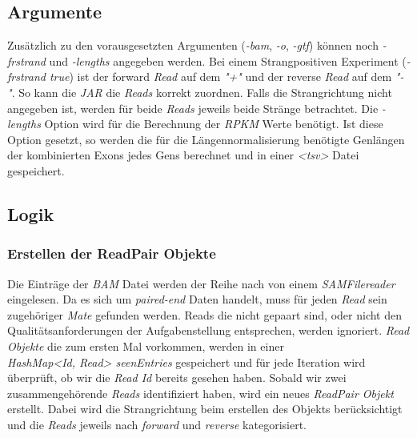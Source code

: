 \documentclass[12pt]{article}
\begin{document}
\subsection{Argumente}
Zusätzlich zu den vorausgesetzten Argumenten (\textit{-bam}, \textit{-o}, \textit{-gtf}) können noch \textit{-frstrand} und
\textit{-lengths} angegeben werden. 
Bei einem Strangpositiven Experiment (\textit{-frstrand true}) ist der forward \textit{Read} auf dem \textit{"+"} und der reverse \textit{Read} auf dem
\textit{"-"}. So kann die \textit{JAR} die \textit{Reads} korrekt zuordnen. 
Falls die Strangrichtung nicht angegeben ist, werden für beide \textit{Reads} jeweils beide Stränge betrachtet.
Die \textit{-lengths} Option wird für die Berechnung der \textit{RPKM} Werte benötigt. 
Ist diese Option gesetzt, so werden die für die Längennormalisierung benötigte Genlängen der kombinierten Exons jedes
Gens berechnet und in einer \textit{<tsv>} Datei gespeichert.
\subsection{Logik}
\subsubsection{Erstellen der ReadPair Objekte}

Die Einträge der \textit{BAM} Datei werden der Reihe nach von einem \textit{SAMFilereader} eingelesen. Da es
sich um \textit{paired-end} Daten handelt, muss für jeden \textit{Read} sein zugehöriger \textit{Mate} gefunden werden. 
Reads die nicht gepaart sind, oder nicht den Qualitätsanforderungen der Aufgabenstellung entsprechen,
werden ignoriert.
\textit{Read Objekte} die zum ersten Mal vorkommen, werden in einer \\ \textit{HashMap<Id, Read> seenEntries}
gespeichert und für jede Iteration wird überprüft, ob wir die \textit{Read Id} bereits gesehen haben.
Sobald wir zwei zusammengehörende \textit{Reads} identifiziert haben, wird ein neues
\textit{ReadPair Objekt} erstellt. Dabei wird die Strangrichtung beim erstellen des Objekts berücksichtigt und
die \textit{Reads} jeweils nach \textit{forward} und \textit{reverse} kategorisiert.
\newpage
\end{document}
